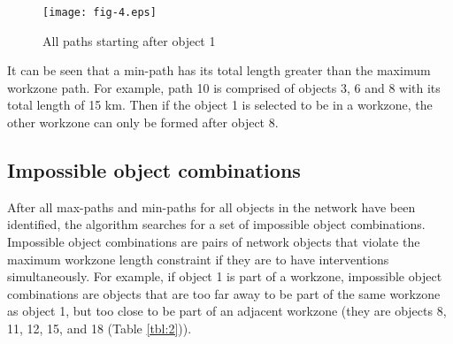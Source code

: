 \documentclass[10pt]{article}
\begin{document}
\begin{figure}[h]
\begin{center}
\texttt{[image: fig-4.eps]}
\caption{All paths starting after object 1}
\end{center}
\end{figure}

It can be seen that a min-path has its total length greater than the maximum
workzone path. For example, path 10 is comprised of objects 3, 6 and 8 with its
total length of 15 km. Then if the object 1 is selected to be in a workzone, the
other workzone can only be formed after object 8.

\subsection{Impossible object combinations}

After all max-paths and min-paths for all objects in the network have been
identified, the algorithm searches for a set of impossible object combinations.
Impossible object combinations are pairs of network objects that violate the
maximum workzone length constraint if they are to have interventions
simultaneously. For example, if object 1 is part of a workzone, impossible object
combinations are objects that are too far away to be part of the same workzone as
object 1, but too close to be part of an adjacent workzone (they are objects 8,
11, 12, 15, and 18 (Table \ref{tbl:2})).
\end{document}
